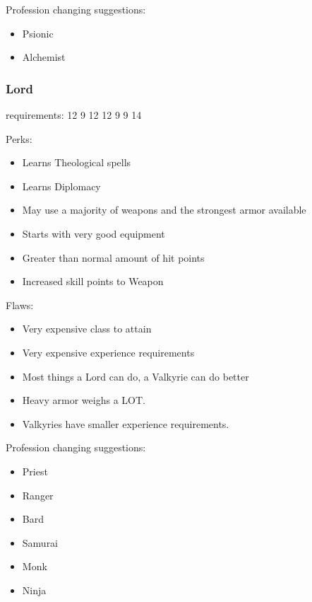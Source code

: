 \documentclass[12pt]{article}
\newcommand{\WviiTwoColumnSetup}{\raggedcolumns\RaggedRight}
\begin{document}
Profession changing suggestions:

\begin{itemize}
\item
  Psionic
\item
  Alchemist
\end{itemize}


\subsubsection{Lord}\label{lord}

requirements: 12 9 12 12 9 9 14

\begin{multicols}{2}\WviiTwoColumnSetup
Perks:

\begin{itemize}
\item
  Learns Theological spells
\item
  Learns Diplomacy
\item
  May use a majority of weapons and the strongest armor available
\item
  Starts with very good equipment
\item
  Greater than normal amount of hit points
\item
  Increased skill points to Weapon
\end{itemize}
\columnbreak

Flaws:

\begin{itemize}
\item
  Very expensive class to attain
\item
  Very expensive experience requirements
\item
  Most things a Lord can do, a Valkyrie can do better
\item
  Heavy armor weighs a LOT.
\item
  Valkyries have smaller experience requirements.
\end{itemize}
\end{multicols}

Profession changing suggestions:

\begin{itemize}
\item
  Priest
\item
  Ranger
\item
  Bard
\item
  Samurai
\item
  Monk
\item
  Ninja
\end{itemize}
\end{document}

